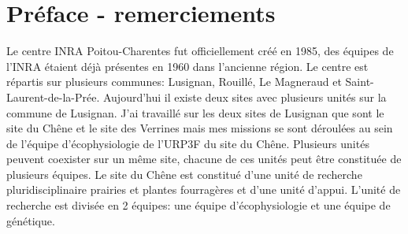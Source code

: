 \documentclass[12pt]{report}
\begin{document}





\tableofcontents
\listoffigures
{}

\chapter*{Préface - remerciements}

Le centre INRA Poitou-Charentes fut officiellement créé en 1985, des équipes
de l'INRA étaient déjà présentes en 1960 dans l'ancienne région. Le centre est répartis sur plusieurs communes:
Lusignan, Rouillé, Le Magneraud et Saint-Laurent-de-la-Prée. Aujourd'hui il
existe deux sites avec plusieurs unités sur la commune de Lusignan. J'ai
travaillé sur les deux sites de Lusignan que sont le site du Chêne et le site
des Verrines mais mes missions se sont déroulées au sein de l'équipe
d'écophysiologie de l'URP3F du site du Chêne. Plusieurs unités peuvent coexister
sur un même site, chacune de ces unités peut être constituée de plusieurs
équipes. Le site du Chêne est constitué d'une unité de recherche
pluridisciplinaire prairies et plantes fourragères et d'une unité d'appui.
L'unité de recherche est divisée en 2 équipes: une équipe d'écophysiologie et
une équipe de génétique.\\
\end{document}
